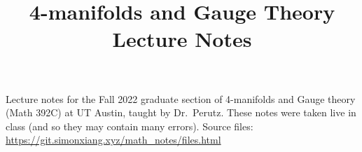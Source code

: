 \documentclass[fontsize=9pt]{article}
\title{4-manifolds and Gauge Theory Lecture Notes}
\date{}
\begin{document}
\maketitle
Lecture notes for the Fall 2022 graduate section of 4-manifolds and Gauge theory (Math 392C) at UT Austin, taught by Dr.\ Perutz. These notes were taken live in class (and so they may contain many errors). Source files: \url{https://git.simonxiang.xyz/math_notes/files.html}

\tableofcontents
\newpage
    
    
    
    
    
    
    
    
    
    
    
    
\end{document}
